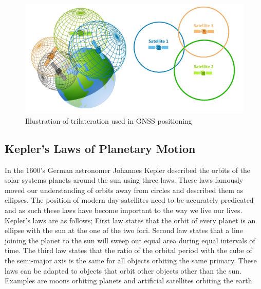 
\begin{figure}[h]
    \begin{centering}
        \includegraphics[width=14cm,keepaspectratio]{Figures/trilateration_new.png}
        \caption{Illustration of trilateration used in GNSS positioning}
        \label{fig:trilateration}
    \end{centering}
\end{figure}

\subsection{Kepler's Laws of Planetary Motion} \label{subsec: OrbitalMechanics}
In the 1600's German astronomer Johannes Kepler described the orbits of the solar systems planets around the sun using three laws. 
These laws famously moved our understanding of orbits away from circles and described them as ellipses. The position of modern day satellites need to be accurately
predicated and as such these laws have become important to the way we live our lives. Kepler's laws are as follows; First law states that the orbit of every planet is an
ellipse with the sun at the one of the two foci. Second law states that a line joining the planet to the sun will sweep out equal area during equal intervals of time.
The third law states that the ratio of the orbital period with the cube of the semi-major axis is the same for all objects orbiting the same primary. These laws can be
adapted to objects that orbit other objects other than the sun. Examples are moons orbiting planets and artificial satellites orbiting the earth.

